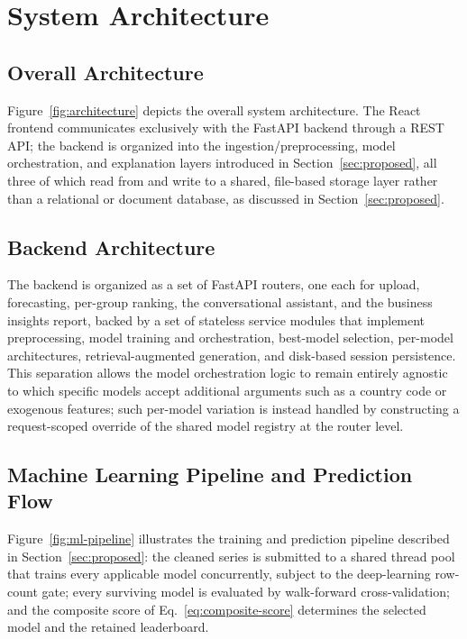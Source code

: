 \section{System Architecture}
\label{sec:architecture}

\subsection{Overall Architecture}
Figure~\ref{fig:architecture} depicts the overall system architecture. The React frontend communicates exclusively with the FastAPI backend through a REST API; the backend is organized into the ingestion/preprocessing, model orchestration, and explanation layers introduced in Section~\ref{sec:proposed}, all three of which read from and write to a shared, file-based storage layer rather than a relational or document database, as discussed in Section~\ref{sec:proposed}.



\subsection{Backend Architecture}
The backend is organized as a set of FastAPI routers, one each for upload, forecasting, per-group ranking, the conversational assistant, and the business insights report, backed by a set of stateless service modules that implement preprocessing, model training and orchestration, best-model selection, per-model architectures, retrieval-augmented generation, and disk-based session persistence. This separation allows the model orchestration logic to remain entirely agnostic to which specific models accept additional arguments such as a country code or exogenous features; such per-model variation is instead handled by constructing a request-scoped override of the shared model registry at the router level.

\subsection{Machine Learning Pipeline and Prediction Flow}
Figure~\ref{fig:ml-pipeline} illustrates the training and prediction pipeline described in Section~\ref{sec:proposed}: the cleaned series is submitted to a shared thread pool that trains every applicable model concurrently, subject to the deep-learning row-count gate; every surviving model is evaluated by walk-forward cross-validation; and the composite score of Eq.~\eqref{eq:composite-score} determines the selected model and the retained leaderboard.

